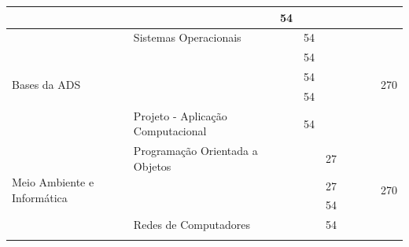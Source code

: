 \documentclass[11pt,fleqn]{book} %
\begin{document}
\begin{table}[]
{\begin{tabular}{|l|l|c|c|c|c|c|c|c|}
			& \nameref{disc:inglacad}                                       & 54              &                 &                 &                 &                 &                 &                      \\ \hline
			\multirow{5}{*}{Bases da ADS} 
			& Sistemas Operacionais                                         &                 & 54              &                 &                 &                 &                 & \multirow{5}{*}{270} \\ \cline{2-8}
			& \nameref{disc:bancodados}                                     &                 & 54              &                 &                 &                 &                 &                      \\ \cline{2-8}
			& \nameref{disc:arqsoft}                                        &                 & 54              &                 &                 &                 &                 &                      \\ \cline{2-8}
			& \nameref{disc:estruturadedados}                               &                 & 54              &                 &                 &                 &                 &                      \\ \cline{2-8}
			& Projeto - Aplicação Computacional                             &                 & 54              &                 &                 &                 &                 &                      \\ \hline
			\multirow{7}{*}{Meio Ambiente e Informática}                     
			& Programação Orientada a Objetos                               &                 &                 & 27              &                 &                 &                 & \multirow{7}{*}{270} \\ \cline{2-8}
			& \nameref{disc:testsoft}                                       &                 &                 & 27              &                 &                 &                 &                      \\ \cline{2-8}
			& \nameref{disc:engreq}                                         &                 &                 & 54              &                 &                 &                 &                      \\ \cline{2-8}
			& Redes de Computadores                                         &                 &                 & 54              &                 &                 &                 &                      \\ \cline{2-8}

\end{tabular}}
\end{table}
\end{document}
